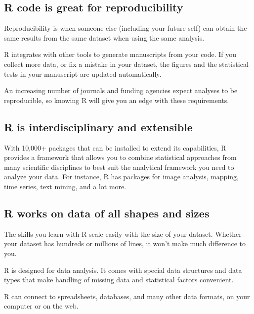 \documentclass[
]{book}
\begin{document}
\hypertarget{r-code-is-great-for-reproducibility}{%
\subsection{R code is great for reproducibility}\label{r-code-is-great-for-reproducibility}}

Reproducibility is when someone else (including your future self) can obtain the
same results from the same dataset when using the same analysis.

R integrates with other tools to generate manuscripts from your code. If you
collect more data, or fix a mistake in your dataset, the figures and the
statistical tests in your manuscript are updated automatically.

An increasing number of journals and funding agencies expect analyses to be
reproducible, so knowing R will give you an edge with these requirements.

\hypertarget{r-is-interdisciplinary-and-extensible}{%
\subsection{R is interdisciplinary and extensible}\label{r-is-interdisciplinary-and-extensible}}

With 10,000+ packages that can be installed to extend its capabilities, R
provides a framework that allows you to combine statistical approaches from many
scientific disciplines to best suit the analytical framework you need to analyze your
data. For instance, R has packages for image analysis, mapping, time series, text mining, and a lot more.

\hypertarget{r-works-on-data-of-all-shapes-and-sizes}{%
\subsection{R works on data of all shapes and sizes}\label{r-works-on-data-of-all-shapes-and-sizes}}

The skills you learn with R scale easily with the size of your dataset. Whether
your dataset has hundreds or millions of lines, it won't make much difference to
you.

R is designed for data analysis. It comes with special data structures and data
types that make handling of missing data and statistical factors convenient.

R can connect to spreadsheets, databases, and many other data formats, on your
computer or on the web.
\end{document}
